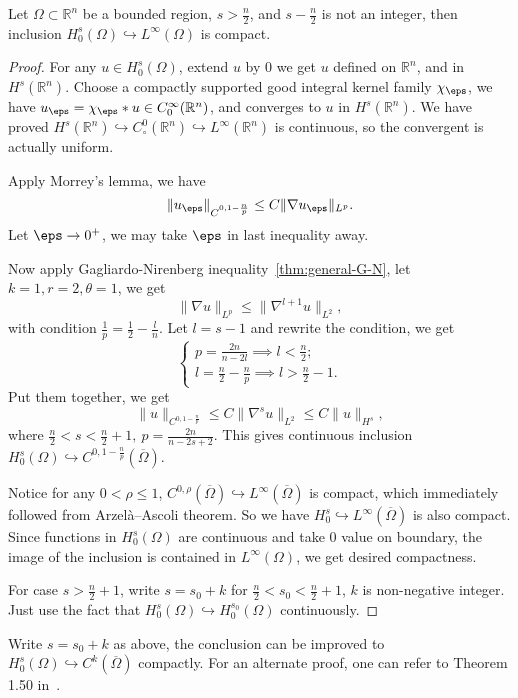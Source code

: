 \documentclass[UTF8,12pt]{article}
\numberwithin{theorem}{section}
\numberwithin{equation}{section}
\begin{document}
\begin{theorem}\label{thm:cpt-Linf}
    \hfill\par
    Let \(\Omega\subset \mathbb{R}^n\) be a bounded region, \(s>\frac{n}{2}\), and
    \(s-\frac{n}{2}\) is not an integer, then inclusion \(H_0^s(\Omega)
    \hookrightarrow L^\infty(\Omega)\) is compact.
\end{theorem}
\begin{proof}
    For any \(u\in H_0^s(\Omega)\), extend \(u\) by 0 we get \(u\) defined on
    \(\mathbb{R}^n\), and in \(H^s(\mathbb{R}^n)\). Choose a compactly supported
    good integral kernel family \(\chi_\eps\), we have \(u_\eps=\chi_\eps*u\in 
    C_0^\infty(\mathbb{R}^n)\), and converges to \(u\) in \(H^s(\mathbb{R}^n)\).
    We have proved \(H^s(\mathbb{R}^n)\hookrightarrow C^0_\circ(\mathbb{R}^n)
    \hookrightarrow L^\infty(\mathbb{R}^n)\) is continuous, so the convergent
    is actually uniform.

    Apply Morrey's lemma, we have \[
        \|u_\eps\|_{C^{0,1-\frac{n}{p}}}\le C\|\nabla u_\eps\|_{L^p}
    .\] Let \(\eps\to 0^+\), we may take \(\eps\) in last inequality away.

    Now apply Gagliardo-Nirenberg inequality~\cref{thm:general-G-N}, let
    \(k=1,r=2,\theta=1\), we get \[
        \|\nabla u\|_{L^p}\le \|\nabla^{l+1}u\|_{L^2},
    \] with condition \(\frac{1}{p}=\frac{1}{2}-\frac{l}{n}\). Let \(l=s-1\) and
    rewrite the condition, we get \[
        \begin{cases}
            p=\frac{2n}{n-2l}\implies l<\frac{n}{2}; \\
            l=\frac{n}{2}-\frac{n}{p}\implies l>\frac{n}{2}-1.
        \end{cases}
    \] Put them together, we get \[
        \|u\|_{C^{0,1-\frac{n}{p}}}\le C\|\nabla^s u\|_{L^2}\le C\|u\|_{H^s},
    \]
    where \(\frac{n}{2}<s<\frac{n}{2}+1,\ p=\frac{2n}{n-2s+2}\).
    This gives continuous inclusion \(H_0^s(\Omega)\hookrightarrow
    C^{0,1-\frac{n}{p}}(\overline{\Omega})\).

    Notice for any \(0<\rho\le 1\), \(C^{0,\rho}(\overline{\Omega})\hookrightarrow
    L^{\infty}(\overline{\Omega})\) is compact, which
    immediately followed from Arzelà–Ascoli theorem. So we have \(H_0^s
    \hookrightarrow L^\infty(\overline{\Omega})\) is also compact. Since functions
    in \(H_0^s(\Omega)\) are continuous and take 0 value on boundary, the image
    of the inclusion is contained in \(L^\infty(\Omega)\), we get desired
    compactness.

    For case \(s>\frac{n}{2}+1\), write \(s=s_0+k\) for \(\frac{n}{2}<s_0<\frac{n}{2}
    +1\), \(k\) is non-negative integer. Just use the fact that \(H_0^s(\Omega)
    \hookrightarrow H_0^{s_0}(\Omega)\) continuously.
\end{proof}
\begin{remark}
    Write \(s=s_0+k\) as above, the conclusion can be improved to \(H_0^s(\Omega)
    \hookrightarrow C^k(\overline{\Omega})\) compactly. For an alternate proof, one
    can refer to Theorem 1.50 in~\cite{bahouri_fourier_2011}.
\end{remark}
\end{document}
